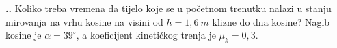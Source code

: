 

\noindent 
\textbf{
\thecjelina.\thezadatak.}
Koliko treba vremena da tijelo koje se u početnom trenutku nalazi u stanju mirovanja na vrhu kosine na visini od  $h=1,6\ m$ klizne do dna kosine? Nagib kosine je $\alpha=39^\circ$, a koeficijent kinetičkog trenja je $\mu_k=0,3$.




